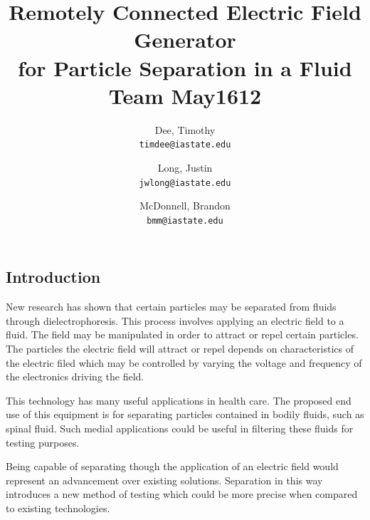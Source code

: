 \documentclass{article}	%
\author{Dee, Timothy\\
    \texttt{timdee@iastate.edu}
    \and
    Long, Justin\\
    \texttt{jwlong@iastate.edu}
    \and
    McDonnell, Brandon\\
    \texttt{bmm@iastate.edu}
}
\title{Remotely Connected Electric Field Generator\\
for Particle Separation in a Fluid \\
\large{Team May1612}}
\newenvironment{vplace}[1][1]
  {\par\vspace*{\stretch{#1}}}
  {\vspace*{\stretch{1}}\par}
\begin{document}
\thispagestyle{empty}
\maketitle

\newpage
\tableofcontents
\newpage

\begin{multicols}{2}


\section{Introduction}
New research has shown that certain particles may be separated from fluids through dielectrophoresis.
This process involves applying an electric field to a fluid.
The field may be manipulated in order to attract or repel certain particles.
The particles the electric field will attract or repel depends on
characteristics of the electric filed which may be controlled
by varying the voltage and frequency of the electronics driving the field.

This technology has many useful applications in health care.
The proposed end use of this equipment is
for separating particles contained in bodily fluids,
such as spinal fluid.
Such medial applications could be useful
in filtering these fluids for testing purposes.

Being capable of separating though the
application of an electric field would represent
an advancement over existing solutions.
Separation in this way introduces a new method of testing which
could be more precise when compared
to existing technologies.


\end{multicols}
\end{document}
